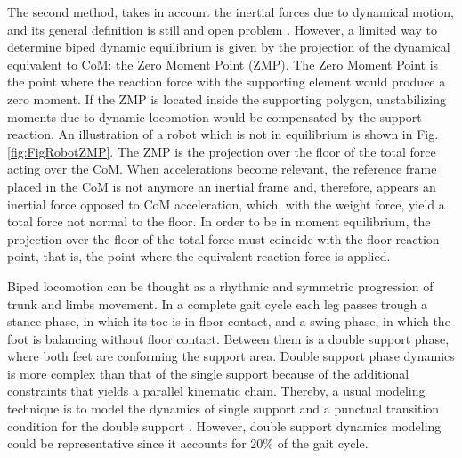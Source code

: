 
The second method, takes in account the inertial forces due to
dynamical motion, and its general definition is still and open problem
\cite{Azevedo04Artificial}. However, a limited way to determine biped
dynamic equilibrium is given by the projection of the dynamical
equivalent to CoM: the Zero Moment Point (ZMP). The Zero Moment Point
is the point where the reaction force with the supporting element
would produce a zero moment. If the ZMP is located inside the
supporting polygon, unstabilizing moments due to dynamic locomotion
would be compensated by the support reaction. An illustration of a
robot which is not in equilibrium is shown in
Fig. \ref{fig:FigRobotZMP}. The ZMP is the projection over the floor
of the total force acting over the CoM. When accelerations become
relevant, the reference frame placed in the CoM is not anymore an
inertial frame and, therefore, appears an inertial force opposed to
CoM acceleration, which, with the weight force, yield a total force
not normal to the floor. In order to be in moment equilibrium, the
projection over the floor of the total force must coincide with the
floor reaction point, that is, the point where the equivalent reaction
force is applied.



Biped locomotion can be thought as a rhythmic and symmetric
progression of trunk and limbs movement. In a complete gait cycle each
leg passes trough a stance phase, in which its toe is in floor
contact, and a swing phase, in which the foot is balancing without
floor contact. Between them is a double support phase, where both feet
are conforming the support area. Double support phase dynamics is more
complex than that of the single support because of the additional
constraints that yields a parallel kinematic chain. Thereby, a usual
modeling technique is to model the dynamics of single support and a
punctual transition condition for the double support
\cite{Garcia98simplest}. However, double support dynamics modeling
could be representative since it accounts for 20\% of the gait cycle.


